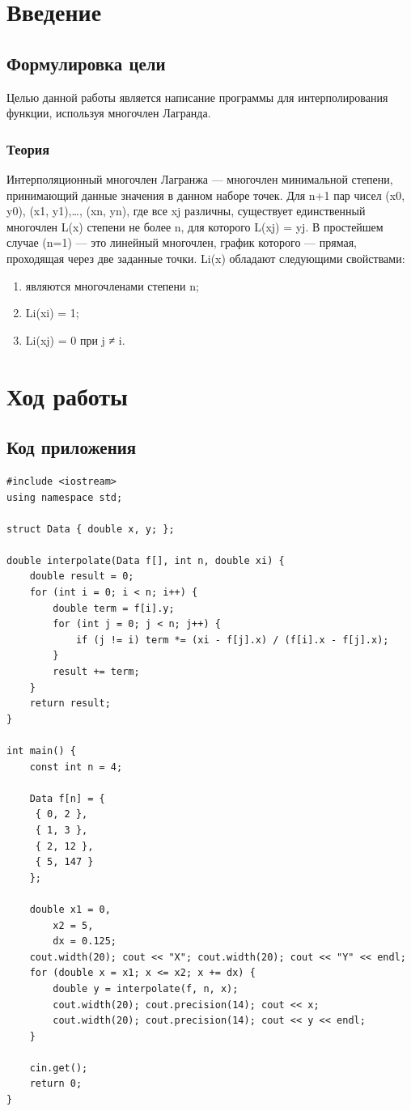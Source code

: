 \documentclass[12pt,a4paper]{scrartcl}
\begin{document}
\section{Введение}
\label{sec:intro}


\subsection{Формулировка цели}
Целью данной работы является написание программы для интерполирования функции, используя многочлен Лагранда.

\subsubsection{Теория}
Интерполяционный многочлен Лагранжа — многочлен минимальной степени, принимающий данные значения в данном наборе точек. Для n+1 пар чисел (x0, y0), (x1, y1),…, (xn, yn), где все xj различны, существует единственный многочлен L(x) степени не более n, для которого L(xj) = yj. В простейшем случае (n=1) — это линейный многочлен, график которого — прямая, проходящая через две заданные точки.
Li(x) обладают следующими свойствами:
\begin{enumerate}
 \item являются многочленами степени n;
 \item Li(xi) = 1;
 \item Li(xj) = 0 при j ≠ i.
\end{enumerate}


\section{Ход работы}
\label{sec:exp}

\subsection{Код приложения}
\label{sec:exp:code}
\begin{verbatim}
#include <iostream>
using namespace std;

struct Data { double x, y; };

double interpolate(Data f[], int n, double xi) {
    double result = 0;
    for (int i = 0; i < n; i++) {
        double term = f[i].y;
        for (int j = 0; j < n; j++) {
            if (j != i) term *= (xi - f[j].x) / (f[i].x - f[j].x);
        }
        result += term;
    }
    return result;
}

int main() {
    const int n = 4;

    Data f[n] = {
     { 0, 2 },
     { 1, 3 },
     { 2, 12 },
     { 5, 147 }
    };

    double x1 = 0,
        x2 = 5,
        dx = 0.125;
    cout.width(20); cout << "X"; cout.width(20); cout << "Y" << endl;
    for (double x = x1; x <= x2; x += dx) {
        double y = interpolate(f, n, x);
        cout.width(20); cout.precision(14); cout << x;
        cout.width(20); cout.precision(14); cout << y << endl;
    }

    cin.get();
    return 0;
}
\end{verbatim}
\end{document}
